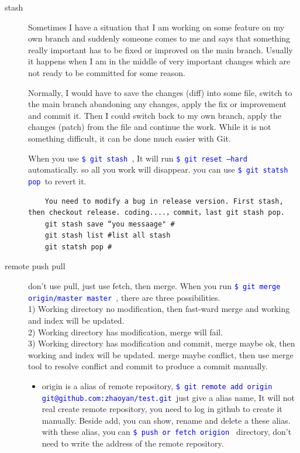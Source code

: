 \documentclass[a4paper,12pt,twoside]{book}
\newcommand{\linuxcommand}[1]{\texttt{\textcolor{blue}{\$ #1 \Pisymbol{psy}{191}}}}
\begin{document}
\begin{description}
\item[stash]
 Sometimes I have a situation that I am working on some feature on my own branch and suddenly someone
    comes to me and says that something really important has to be fixed or improved on the main branch.
    Usually it happens when I am in the middle of very important changes which are not ready to be committed
    for some reason. \par

Normally, I would have to save the changes (diff) into some file, switch to the main branch abandoning any
changes, apply the fix or improvement and commit it. Then I could switch back to my own branch, apply the
changes (patch) from the file and continue the work. While it is not something difficult, it can be done much
easier with Git. \par

When you use \linuxcommand{git stash}, It will run \linuxcommand{git reset --hard} automatically. so all you
work will disappear. you can use \linuxcommand{git statsh pop }to revert it.

    \begin{verbatim}
    You need to modify a bug in release version. First stash, then checkout release. coding....，commit，last git stash pop.
    git stash save “you messaage" #
    git stash list #list all stash
    git statsh pop #
    \end{verbatim}


\item[remote push pull] don't use pull, just use fetch, then merge. 
When you run \linuxcommand{git merge origin/master master}, there are three possibilities. \\
1) Working directory no modification, then fast-ward merge and working and index will be updated. \\
2) Working directory has modification, merge will fail. \\
3) Working directory has modification and commit, merge maybe ok, then working and index will be updated. merge maybe conflict, then use merge tool to resolve conflict and commit to produce a commit manually. \\

\begin{itemize}
\item origin is a alias of remote repository,  \linuxcommand{git remote add origin
    git@github.com:zhaoyan/test.git}just give a alias name, It will not real create remote repository, you need to
    log in github to create it manually.  Beside add, you can show, rename and delete a these alias. with these
    alias, you can \linuxcommand{push or fetch origion} directory, don't need to write the address of the remote
    repository.


\end{itemize}
\end{description}
\end{document}

